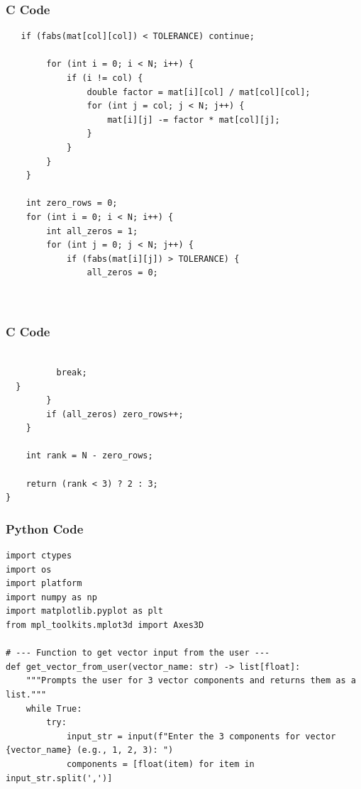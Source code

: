 \documentclass{beamer}
\begin{document}
    \begin{frame}[fragile]
        \frametitle{C Code}
        \begin{lstlisting}
   if (fabs(mat[col][col]) < TOLERANCE) continue;

        for (int i = 0; i < N; i++) {
            if (i != col) {
                double factor = mat[i][col] / mat[col][col];
                for (int j = col; j < N; j++) {
                    mat[i][j] -= factor * mat[col][j];
                }
            }
        }
    }

    int zero_rows = 0;
    for (int i = 0; i < N; i++) {
        int all_zeros = 1;
        for (int j = 0; j < N; j++) {
            if (fabs(mat[i][j]) > TOLERANCE) {
                all_zeros = 0;
              
            
        \end{lstlisting}
    \end{frame}
    \begin{frame}[fragile]
        \frametitle{C Code}
        \begin{lstlisting}

          break;
  }
        }
        if (all_zeros) zero_rows++;
    }
    
    int rank = N - zero_rows;
    
    return (rank < 3) ? 2 : 3;
}
        \end{lstlisting}
    \end{frame}
    
   
    
    \begin{frame}[fragile]
        \frametitle{Python Code}
        \begin{lstlisting}
import ctypes
import os
import platform
import numpy as np
import matplotlib.pyplot as plt
from mpl_toolkits.mplot3d import Axes3D

# --- Function to get vector input from the user ---
def get_vector_from_user(vector_name: str) -> list[float]:
    """Prompts the user for 3 vector components and returns them as a list."""
    while True:
        try:
            input_str = input(f"Enter the 3 components for vector {vector_name} (e.g., 1, 2, 3): ")
            components = [float(item) for item in input_str.split(',')]
            


        \end{lstlisting}
    \end{frame}
    
\end{document}
